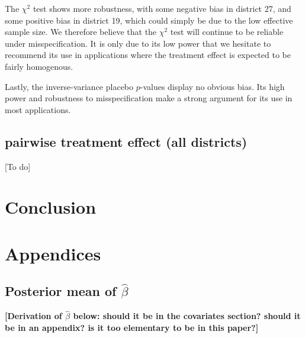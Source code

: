 \documentclass[letter]{article}
\begin{document}
The \(\chi^2\) test shows more robustness, with some negative bias in
district 27, and some positive bias in district 19, which could simply
be due to the low effective sample size. We therefore believe that the
\(\chi^2\) test will continue to be reliable under misspecification. It
is only due to its low power that we hesitate to recommend its use in
applications where the treatment effect is expected to be fairly
homogenous.

Lastly, the inverse-variance placebo \(p\)-values display no obvious
bias. Its high power and robustness to misspecification make a strong
argument for its use in most applications.
    


    	\subsection{pairwise treatment effect (all
districts)}\label{pairwise-treatment-effect-all-districts}

{[}To do{]}
    


    	\section{Conclusion}\label{conclusion}
    


    	\section{Appendices}\label{appendices}
    


    	\subsection{\texorpdfstring{Posterior mean of
\(\hat\beta\)}{Posterior mean of \textbackslash{}hat\textbackslash{}beta}}\label{posterior-mean-of-hatbeta}

\textbf{{[}Derivation of \(\hat{\beta}\) below: should it be in the
covariates section? should it be in an appendix? is it too elementary to
be in this paper?{]}}
\end{document}
